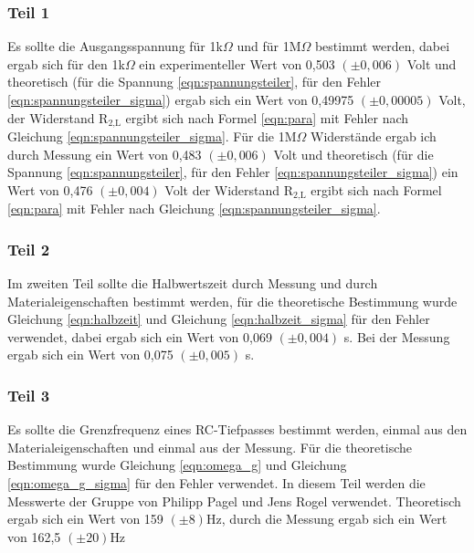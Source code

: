 \documentclass[12pt]{scrartcl}
\begin{document}
\subsubsection{Teil 1}
Es sollte die Ausgangsspannung für 1k$\Omega$ und für 1M$\Omega$ bestimmt werden, dabei ergab sich für den 1k$\Omega$ ein experimenteller Wert von 0,503 $(\pm 0,006)$ Volt und theoretisch (für die Spannung \ref{eqn:spannungsteiler}, für den Fehler \ref{eqn:spannungsteiler_sigma}) ergab sich ein Wert von 0,49975 $(\pm 0,00005)$ Volt, der Widerstand R$_\text{2,L}$ ergibt sich nach Formel \ref{eqn:para} mit Fehler nach Gleichung \ref{eqn:spannungsteiler_sigma}. Für die 1M$\Omega$ Widerstände ergab ich durch Messung ein Wert von 0,483 $(\pm 0,006)$ Volt und theoretisch (für die Spannung \ref{eqn:spannungsteiler}, für den Fehler \ref{eqn:spannungsteiler_sigma}) ein Wert von 0,476 $(\pm 0,004)$ Volt der Widerstand R$_\text{2,L}$ ergibt sich nach Formel \ref{eqn:para} mit Fehler nach Gleichung \ref{eqn:spannungsteiler_sigma}.

\subsubsection{Teil 2}
Im zweiten Teil sollte die Halbwertszeit durch Messung und durch Materialeigenschaften bestimmt werden, für die theoretische Bestimmung wurde Gleichung \ref{eqn:halbzeit} und Gleichung \ref{eqn:halbzeit_sigma} für den Fehler verwendet, dabei ergab sich ein Wert von 0,069	$(\pm 0,004)$ s. Bei der Messung ergab sich ein Wert von 0,075 $(\pm 0,005)$ s.

\subsubsection{Teil 3}
Es sollte die Grenzfrequenz eines RC-Tiefpasses bestimmt werden, einmal aus den Materialeigenschaften und einmal aus der Messung. Für die theoretische Bestimmung wurde Gleichung \ref{eqn:omega_g} und Gleichung \ref{eqn:omega_g_sigma} für den Fehler verwendet.
In diesem Teil werden die Messwerte der Gruppe von Philipp Pagel und Jens Rogel verwendet.
Theoretisch ergab sich ein Wert von 159 $(\pm 8)$Hz, durch die Messung ergab sich ein Wert von 162,5 $(\pm 20)$Hz 
\end{document}
